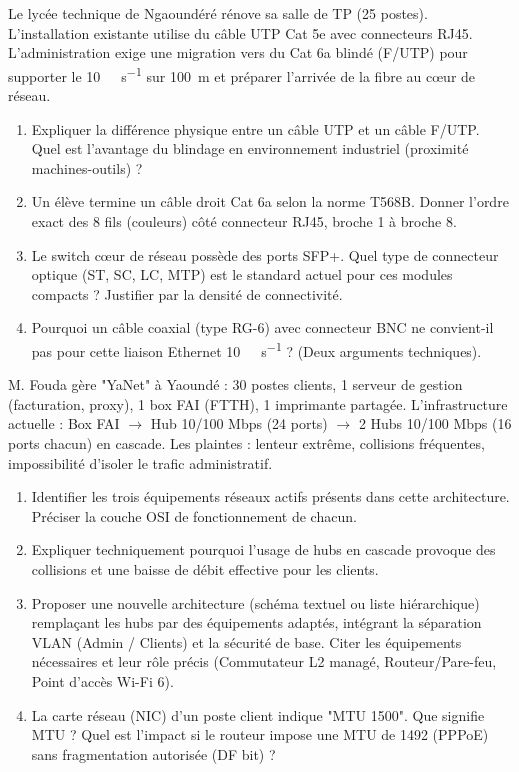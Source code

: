 \documentclass[11pt]{article}
\begin{document}
\begin{exercice}
Le lycée technique de Ngaoundéré rénove sa salle de TP (25 postes). L'installation existante utilise du câble UTP Cat 5e avec connecteurs RJ45. L'administration exige une migration vers du Cat 6a blindé (F/UTP) pour supporter le \SI{10}{\giga\bit\per\second} sur \SI{100}{\metre} et préparer l'arrivée de la fibre au cœur de réseau.
\begin{enumerate}
    \item Expliquer la différence physique entre un câble UTP et un câble F/UTP. Quel est l'avantage du blindage en environnement industriel (proximité machines-outils) ?
    \item Un élève termine un câble droit Cat 6a selon la norme T568B. Donner l'ordre exact des 8 fils (couleurs) côté connecteur RJ45, broche 1 à broche 8.
    \item Le switch cœur de réseau possède des ports SFP+. Quel type de connecteur optique (ST, SC, LC, MTP) est le standard actuel pour ces modules compacts ? Justifier par la densité de connectivité.
    \item Pourquoi un câble coaxial (type RG-6) avec connecteur BNC ne convient-il pas pour cette liaison Ethernet \SI{10}{\giga\bit\per\second} ? (Deux arguments techniques).
\end{enumerate}
\end{exercice}

\begin{exercice}
M. Fouda gère "YaNet" à Yaoundé : 30 postes clients, 1 serveur de gestion (facturation, proxy), 1 box FAI (FTTH), 1 imprimante partagée. L'infrastructure actuelle : Box FAI $\to$ Hub 10/100 Mbps (24 ports) $\to$ 2 Hubs 10/100 Mbps (16 ports chacun) en cascade. Les plaintes : lenteur extrême, collisions fréquentes, impossibilité d'isoler le trafic administratif.
\begin{enumerate}
    \item Identifier les trois équipements réseaux actifs présents dans cette architecture. Préciser la couche OSI de fonctionnement de chacun.
    \item Expliquer techniquement pourquoi l'usage de hubs en cascade provoque des collisions et une baisse de débit effective pour les clients.
    \item Proposer une nouvelle architecture (schéma textuel ou liste hiérarchique) remplaçant les hubs par des équipements adaptés, intégrant la séparation VLAN (Admin / Clients) et la sécurité de base. Citer les équipements nécessaires et leur rôle précis (Commutateur L2 managé, Routeur/Pare-feu, Point d'accès Wi-Fi 6).
    \item La carte réseau (NIC) d'un poste client indique "MTU 1500". Que signifie MTU ? Quel est l'impact si le routeur impose une MTU de 1492 (PPPoE) sans fragmentation autorisée (DF bit) ?
\end{enumerate}
\end{exercice}
\end{document}

